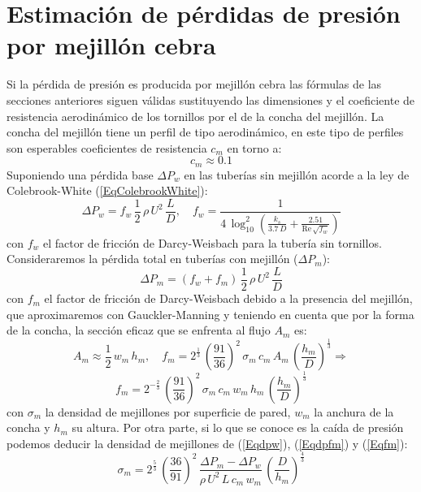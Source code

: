 \documentclass[a4paper]{article}
\newcommand{\EQ}[2]{\begin{equation}#1\label{#2}\end{equation}}
\begin{document}
\section{Estimación de pérdidas de presión por mejillón cebra}

Si la pérdida de presión es producida por mejillón cebra las fórmulas de las
secciones anteriores siguen válidas sustituyendo las dimensiones y el
coeficiente de resistencia aerodinámico de los tornillos por el de la concha del
mejillón. La concha del mejillón tiene un perfil de tipo aerodinámico, en este
tipo de perfiles son esperables coeficientes de resistencia $c_m$ en torno a:
\EQ{c_m\approx0.1}{Eqcm}
Suponiendo una pérdida base $\Delta P_w$ en las tuberías sin mejillón acorde a
la ley de Colebrook-White (\ref{EqColebrookWhite}):
\EQ
{
	\Delta P_w=f_w\,\frac12\,\rho\,U^2\,\frac{L}{D},\quad
	f_w=\frac1{4\,\log_{10}^2\left(\frac{k_s}{3.7\,D}
	+\frac{2.51}{\mathrm{Re}\,\sqrt{f_w}}\right)}
}{Eqdpw}
con $f_w$ el factor de fricción de Darcy-Weisbach para la tubería sin tornillos.
Consideraremos la pérdida total en tuberías con mejillón ($\Delta P_m$):
\EQ{\Delta P_m=\left(f_w+f_m\right)\,\frac12\,\rho\,U^2\,\frac{L}{D}}{Eqdpfm}
con $f_m$ el factor de fricción de Darcy-Weisbach debido a la presencia del
mejillón, que aproximaremos con Gauckler-Manning y teniendo en cuenta que
por la forma de la concha, la sección eficaz que se enfrenta al flujo $A_m$ es:
\[
  A_m\approx\frac12\,w_m\,h_m,\quad
  f_m=2^{\frac13}\,\left(\frac{91}{36}\right)^2\,\sigma_m\,c_m\,A_m
  \,\left(\frac{h_m}{D}\right)^{\frac13}\Rightarrow
\]
\EQ
{
  f_m=2^{-\frac23}\,\left(\frac{91}{36}\right)^2\,\sigma_m\,c_m\,w_m\,h_m
  \,\left(\frac{h_m}{D}\right)^{\frac13}
}{Eqfm}
con $\sigma_m$ la densidad de mejillones por superficie de pared, $w_m$ la
anchura de la concha y $h_m$ su altura. Por otra parte, si lo que se conoce es
la caída de presión podemos deducir la densidad de mejillones de (\ref{Eqdpw}),
(\ref{Eqdpfm}) y (\ref{Eqfm}):
\EQ
{
  \sigma_m=2^\frac53\,\left(\frac{36}{91}\right)^2
  \,\frac{\Delta P_m-\Delta P_w}{\rho\,U^2\,L\,c_m\,w_m}
  \,\left(\frac{D}{h_m}\right)^{\frac43}
}{Eqsigmam}
\end{document}
